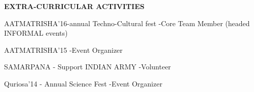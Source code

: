 \documentclass{article}
\begin{document}
\begin{center}

\textbf{\LARGE EXTRA-CURRICULAR ACTIVITIES}
\begin{itemize}
	{\large \item AATMATRISHA'16-annual Techno-Cultural fest
		-Core Team Member (headed INFORMAL events) }
	{\large \item AATMATRISHA'15
		-Event Organizer}
	{\large \item SAMARPANA - Support INDIAN ARMY
		-Volunteer }
	{\large \item Quriosa'14 - Annual Science Fest
		-Event Organizer }
\end{itemize}\vspace{15px}

\end{center}
\end{document}
